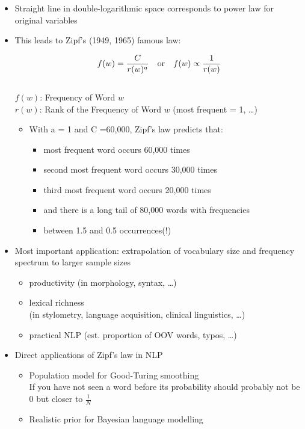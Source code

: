 \documentclass[a4paper,landscape,headrule,footrule,xetex]{foils}
\begin{document}

\begin{itemize}
\item Straight line in double-logarithmic space corresponds to
power law for original variables
\item This leads to Zipf's (1949, 1965) famous law:

  \begin{equation}
    \label{eq:1}
    f(w) = \frac{C}{r(w)^a}\ \ \  \textnormal{or} \ \ \  f(w) \propto \frac{1}{r(w)}
  \end{equation}
\\ $f(w)$: Frequency of Word $w$
 \\ $r(w)$: Rank of the Frequency of Word $w$ (most frequent = 1, \ldots)

\begin{itemize}
  \item With a = 1 and C =60,000, Zipf's law predicts that:
\begin{itemize}
  \item most frequent word occurs 60,000 times
  \item second most frequent word occurs 30,000 times
  \item third most frequent word occurs 20,000 times
  \item and there is a long tail of 80,000 words with frequencies
  \item between 1.5 and 0.5 occurrences(!)
  \end{itemize}
\end{itemize}
\end{itemize}

\begin{itemize}
  \item Most important application: extrapolation of vocabulary
size and frequency spectrum to larger sample sizes
\begin{itemize}
  \item productivity (in morphology, syntax, \ldots)
  \item lexical richness
\\ (in stylometry, language acquisition, clinical linguistics, \ldots)
\item practical NLP (est. proportion of OOV words, typos, \ldots)
\end{itemize}
\item Direct applications of Zipf's law in NLP
\begin{itemize}
\item Population model for Good-Turing smoothing \\ If you have not
  seen a word before its probability should probably not be $0$ but
  closer to $\frac{1}{N}$
  \item Realistic prior for Bayesian language modelling
  \end{itemize}
\end{itemize}
\end{document}
